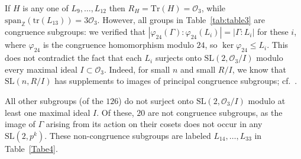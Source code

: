 \documentclass[11pt]{amsart}
\theoremstyle{definition}
\theoremstyle{remark}
\newcommand{\Z}{\mathbb{Z}}
\newcommand{\G}{{\Gamma}}
\newcommand{\SL}{\mathrm{SL}}
\newcommand{\tr}{\mathrm{tr}}
\begin{document}
If $H$ is any one of $L_9,\ldots , L_{12}$ then 
$R_H= \mathrm{Tr}(H)=\mathcal{O}_3$, while 
$\mathrm{span}_\Z(\tr(L_{13}))= \allowbreak 3\mathcal{O}_3$. 
However, all groups in Table~\ref{tab:table3} are congruence 
subgroups: we verified that $|\varphi_{24}(\Gamma):\varphi_{24}(L_i)|
=|\Gamma:L_i|$ for these $i$, where $\varphi_{24}$ is the congruence
homomorphism modulo $24$, so $\ker \varphi_{24}\leq L_i$.
This does not contradict 
the fact that each $L_i$ surjects onto $\SL(2, \mathcal{O}_3/I)$ 
modulo every maximal ideal $I\subset \mathcal{O}_3$. 
Indeed, for small $n$ and small $R/I$, we know that $\SL(n,R/I)$ has 
supplements to images of principal congruence subgroups; 
cf.~\cite[Section~2.3]{Density}.

All other subgroups (of the $126$) do not surject onto 
$\SL(2,\mathcal{O}_3/I)$ modulo at least one  maximal  ideal $I$. 
Of these, $20$ are not congruence subgroups, as the image of $\G$ 
arising from its action on their cosets does not occur in any 
$\SL(2,p^k)$. These non-congruence subgroups are labeled 
$L_{14},\ldots, L_{33}$ in Table~\ref{Tabe4}. 
\end{document}
